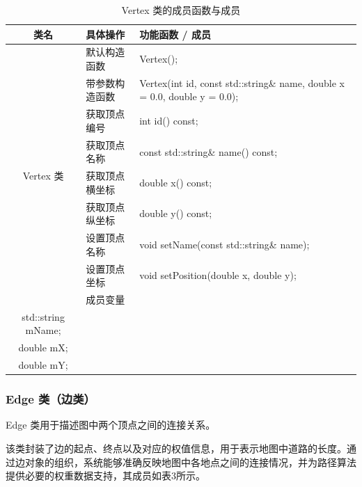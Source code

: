 \documentclass[UTF8,12pt,a4paper]{ctexart}
\begin{document}
\begin{table}[H]
\centering
\caption{Vertex 类的成员函数与成员}
\renewcommand{\arraystretch}{1.3}
\begin{tabular}{|
c|
>{\centering\arraybackslash}m{4cm}|
>{\centering\arraybackslash}m{9cm}|}
\hline
\textbf{类名} & \textbf{具体操作} & \textbf{功能函数 / 成员} \\
\hline
\multirow{9}{*}{Vertex 类}
& 默认构造函数
& Vertex(); \\
\cline{2-3}

& 带参数构造函数
& Vertex(int id, const std::string\& name, double x = 0.0, double y = 0.0); \\
\cline{2-3}

& 获取顶点编号
& int id() const; \\
\cline{2-3}

& 获取顶点名称
& const std::string\& name() const; \\
\cline{2-3}

& 获取顶点横坐标
& double x() const; \\
\cline{2-3}

& 获取顶点纵坐标
& double y() const; \\
\cline{2-3}

& 设置顶点名称
& void setName(const std::string\& name); \\
\cline{2-3}

& 设置顶点坐标
& void setPosition(double x, double y); \\
\cline{2-3}

& 成员变量
& {\centering
  int mId;\\[0.5ex]
  std::string mName;\\[0.5ex]
  double mX;\\[0.5ex]
  double mY;}\\
\hline

\end{tabular}
\end{table}


\subsubsection{Edge 类（边类）}

Edge 类用于描述图中两个顶点之间的连接关系。

该类封装了边的起点、终点以及对应的权值信息，用于表示地图中道路的长度。通过边对象的组织，系统能够准确反映地图中各地点之间的连接情况，并为路径算法提供必要的权重数据支持，其成员如表3所示。
\end{document}
